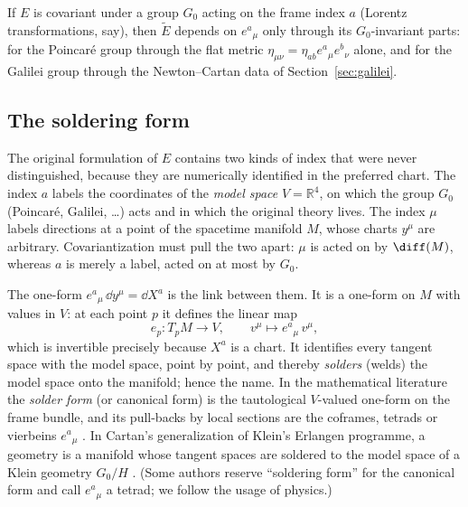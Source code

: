\begin{remark}\label{rem:soldering-dep}
If $E$ is covariant under a group $G_0$ acting on the frame index $a$ (Lorentz
transformations, say), then $\tilde E$ depends on $e^a{}_\mu$ only through its
$G_0$-invariant parts: for the Poincar\'e group through the flat metric
$\eta_{\mu\nu}=\eta_{ab}e^a{}_\mu e^b{}_\nu$ alone, and for the Galilei group
through the Newton--Cartan data of Section~\ref{sec:galilei}.
\end{remark}

\subsection{The soldering form}
\label{sec:soldering}

The original formulation of $E$ contains two kinds of index that were never
distinguished, because they are numerically identified in the preferred chart.
The index $a$ labels the coordinates of the \emph{model space} $V=\mathbb R^4$,
on which the group $G_0$ (Poincar\'e, Galilei, \dots) acts and in which the
original theory lives. The index $\mu$ labels directions at a point of the
spacetime manifold $M$, whose charts $y^\mu$ are arbitrary. Covariantization
must pull the two apart: $\mu$ is acted on by $\diff(M)$, whereas $a$ is merely
a label, acted on at most by $G_0$.

The one-form $e^a{}_\mu\,\dd y^\mu=\dd X^a$ is the link between them. It is a
one-form on $M$ with values in $V$: at each point $p$ it defines the linear map
\begin{equation}
  e_p\colon T_pM\to V,\qquad v^\mu\mapsto e^a{}_\mu\,v^\mu ,
\end{equation}
which is invertible precisely because $X^a$ is a chart. It identifies every
tangent space with the model space, point by point, and thereby \emph{solders}
(welds) the model space onto the manifold; hence the name. In the mathematical
literature the \emph{solder form} (or canonical form) is the tautological
$V$-valued one-form on the frame bundle, and its pull-backs by local sections
are the coframes, tetrads or vierbeins $e^a{}_\mu$ \cite{kn}. In Cartan's
generalization of Klein's Erlangen programme, a geometry is a manifold whose
tangent spaces are soldered to the model space of a Klein geometry $G_0/H$
\cite{sharpe}. (Some authors reserve ``soldering form'' for the canonical
form and call $e^a{}_\mu$ a tetrad; we follow the usage of physics.)

